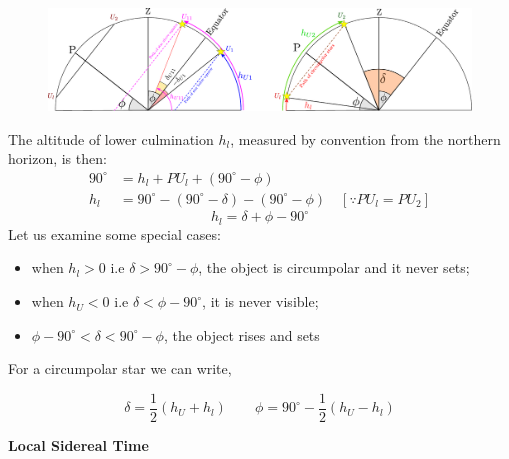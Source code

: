 \documentclass[a4paper,12pt]{extarticle}
\begin{document}
\begin{figure}[H]
	\centering
	\includegraphics[width=\linewidth]{circumpolar.pdf}
\end{figure}

The altitude of lower culmination $h_l$, measured by convention from the northern horizon, is then:
\begin{align*}
	90^\circ&= h_{l}+PU_l+(90^\circ-\phi)\\
	h_l&=90^\circ -(90^\circ-\delta)-(90^\circ-\phi)  \quad [\because PU_l=PU_2]
\end{align*}
\begin{equation}
	\boxed{h_l=\delta+\phi-90^\circ}
\end{equation}
Let us examine some special cases:
\begin{itemize}
	\itemsep0em 
	\item when $h_l>0$ i.e $\delta >90^\circ -\phi$, the object is circumpolar and it never sets;
	\item when $h_U<0$ i.e $\delta <\phi-90^\circ$, it is never visible;
	\item $\phi-90^\circ <\delta<90^\circ-\phi$, the object rises and sets
\end{itemize}
For a circumpolar star we can write, 
\begin{defi}
	\[\boxed{\delta=\frac{1}{2}(h_U+h_l)}\quad\quad\boxed{\phi=90^\circ- \frac{1}{2}(h_U-h_l)}\]	
\end{defi}

\vspace{0.5cm}
\textsf{\textbf{Local Sidereal Time}}\\
\end{document}
